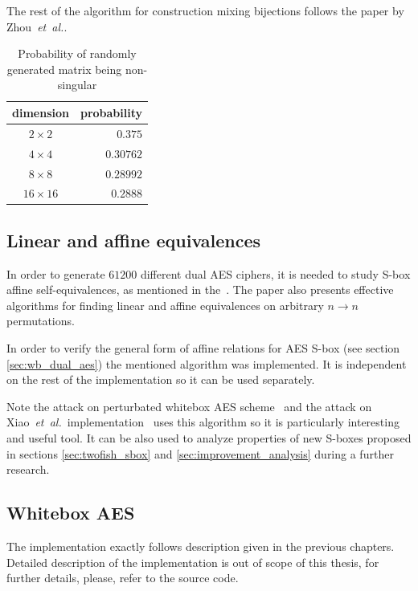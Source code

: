 \documentclass[11pt,oneside,final]{fithesis2}
\newcommand{\eal}{\emph{et~al.}}
\begin{document}
    The rest of the algorithm for construction mixing bijections follows the paper by Zhou~\eal.
    
    \begin{table}[!htb]
    \begin{center}
    \begin{tabular}{ | c | r | }
	\hline
	dimension     & probability    \\ \hline \hline
	$2\times2$    & $0.375$        \\ \hline
	$4\times4$    & $ 0.30762$     \\ \hline
	$8\times8$    & $ 0.28992$     \\ \hline
	$16\times16$  & $ 0.2888$      \\ \hline
    \end{tabular}
    \caption{Probability of randomly generated matrix being non-singular}
    \label{tbl:random_matrix_nonsingular_probab}
    \end{center} 
    \end{table}
    
    \subsection{Linear and affine equivalences}
    In order to generate $61200$ different dual AES ciphers, it is needed to study S-box affine self-equivalences, as mentioned in the~\citep{Biryukov:2003:TCL:1766171.1766175}.
    The paper also presents effective algorithms for finding linear and affine equivalences on arbitrary $n \rightarrow n$ permutations. 
    
    In order to verify the general form of affine relations for AES S-box (see section \ref{sec:wb_dual_aes}) the mentioned algorithm was implemented. It is independent 
    on the rest of the implementation so it can be used separately. 
    
    Note the attack on perturbated whitebox AES scheme~\citep{conf/indocrypt/MulderWP10} 
    and the attack on Xiao~\eal~implementation~\citep{conf/sacrypt/MulderRP12} uses this algorithm so it is particularly interesting and useful tool. It can be also used to analyze properties
    of new S-boxes proposed in sections \ref{sec:twofish_sbox} and \ref{sec:improvement_analysis} during a further research.
    
    \subsection{Whitebox AES}
    The implementation exactly follows description given in the previous chapters. Detailed description of the implementation is out of scope of this thesis, 
    for further details, please, refer to the source code. 
    
\end{document}
